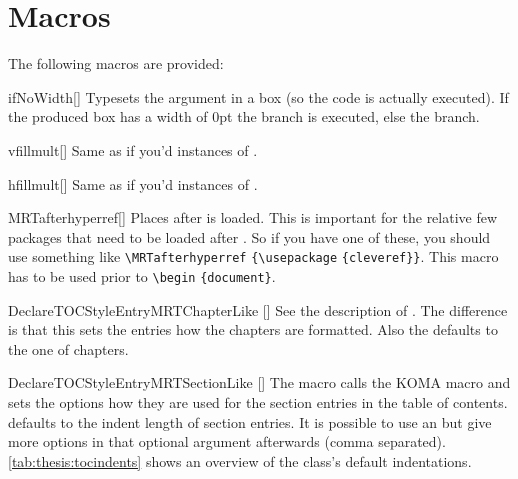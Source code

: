 \section{Macros}\label{sec:thesis:mac}%
The following macros are provided:
\begin{describemacroTF}{ifNoWidth}[]
  Typesets the argument in a box (so the code is actually executed). If the
  produced box has a width of 0pt the  branch is executed, else the
   branch.
\end{describemacroTF}
\begin{describemacro}{vfillmult}[]
  Same as if you'd  instances of .
\end{describemacro}
\begin{describemacro}{hfillmult}[]
  Same as if you'd  instances of .
\end{describemacro}
\begin{describemacro}{MRTafterhyperref}[]
  Places  after  is loaded. This is important for
  the relative few packages that need to be loaded after . So if
  you have one of these, you should use something like
  \verb|\MRTafterhyperref|\hskip0pt
  \verb|{\usepackage|\hskip0pt
  \verb|{cleveref}}|. This macro has to be used prior to
  \verb|\begin|\hskip0pt
  \verb|{document}|.
\end{describemacro}
\begin{describemacro}{DeclareTOCStyleEntryMRTChapterLike}%
  [\hskip0pt]
  See the description of . The difference
  is that this sets the entries how the chapters are formatted. Also the
   defaults to the one of chapters.
\end{describemacro}
\begin{describemacro}{DeclareTOCStyleEntryMRTSectionLike}%
  [\hskip0pt]
  The macro calls the KOMA macro  and sets the options
  how they are used for the section entries in the table of contents.
   defaults to the indent length of section entries. It is possible
  to use an  but give more options in that optional argument
  afterwards (comma separated). \autoref{tab:thesis:tocindents} shows an
  overview of the class's default indentations.
\end{describemacro}

